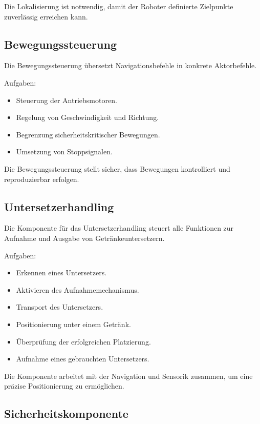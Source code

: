Die Lokalisierung ist notwendig, damit der Roboter definierte Zielpunkte
zuverlässig erreichen kann.

\subsection{Bewegungssteuerung}\label{bewegungssteuerung-1}

Die Bewegungssteuerung übersetzt Navigationsbefehle in konkrete
Aktorbefehle.

Aufgaben:

\begin{itemize}
\tightlist
\item
  Steuerung der Antriebsmotoren.
\item
  Regelung von Geschwindigkeit und Richtung.
\item
  Begrenzung sicherheitskritischer Bewegungen.
\item
  Umsetzung von Stoppsignalen.
\end{itemize}

Die Bewegungssteuerung stellt sicher, dass Bewegungen kontrolliert und
reproduzierbar erfolgen.

\subsection{Untersetzerhandling}\label{untersetzerhandling-1}

Die Komponente für das Untersetzerhandling steuert alle Funktionen zur
Aufnahme und Ausgabe von Getränkeuntersetzern.

Aufgaben:

\begin{itemize}
\tightlist
\item
  Erkennen eines Untersetzers.
\item
  Aktivieren des Aufnahmemechanismus.
\item
  Transport des Untersetzers.
\item
  Positionierung unter einem Getränk.
\item
  Überprüfung der erfolgreichen Platzierung.
\item
  Aufnahme eines gebrauchten Untersetzers.
\end{itemize}

Die Komponente arbeitet mit der Navigation und Sensorik zusammen, um
eine präzise Positionierung zu ermöglichen.

\subsection{Sicherheitskomponente}\label{sicherheitskomponente-1}


